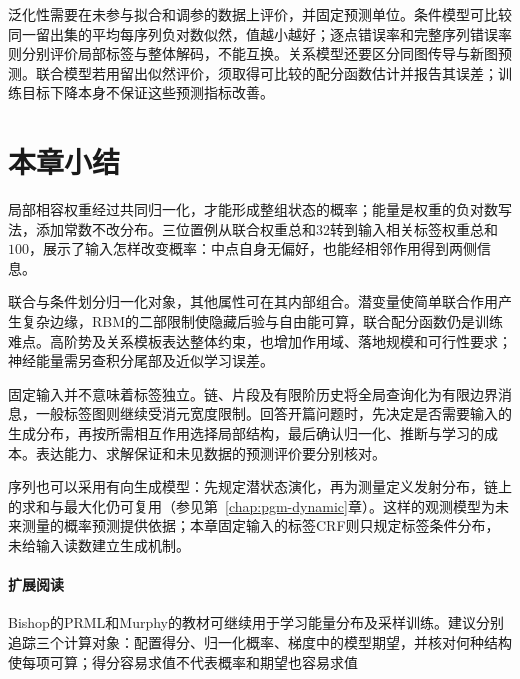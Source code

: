 泛化性需要在未参与拟合和调参的数据上评价，并固定预测单位。条件模型可比较同一留出集的平均每序列负对数似然，值越小越好；逐点错误率和完整序列错误率则分别评价局部标签与整体解码，不能互换。关系模型还要区分同图传导与新图预测。联合模型若用留出似然评价，须取得可比较的配分函数估计并报告其误差；训练目标下降本身不保证这些预测指标改善。

\section{本章小结}
\label{sec:pgm-energy-models-summary}

局部相容权重经过共同归一化，才能形成整组状态的概率；能量是权重的负对数写法，添加常数不改分布。三位置例从联合权重总和$32$转到输入相关标签权重总和$100$，展示了输入怎样改变概率：中点自身无偏好，也能经相邻作用得到两侧信息。

联合与条件划分归一化对象，其他属性可在其内部组合。潜变量使简单联合作用产生复杂边缘，RBM的二部限制使隐藏后验与自由能可算，联合配分函数仍是训练难点。高阶势及关系模板表达整体约束，也增加作用域、落地规模和可行性要求；神经能量需另查积分尾部及近似学习误差。

固定输入并不意味着标签独立。链、片段及有限阶历史将全局查询化为有限边界消息，一般标签图则继续受消元宽度限制。回答开篇问题时，先决定是否需要输入的生成分布，再按所需相互作用选择局部结构，最后确认归一化、推断与学习的成本。表达能力、求解保证和未见数据的预测评价要分别核对。

序列也可以采用有向生成模型：先规定潜状态演化，再为测量定义发射分布，链上的求和与最大化仍可复用（参见第~\ref{chap:pgm-dynamic}章）。这样的观测模型为未来测量的概率预测提供依据；本章固定输入的标签CRF则只规定标签条件分布，未给输入读数建立生成机制。

\paragraph{扩展阅读}
Bishop的PRML和Murphy的教材可继续用于学习能量分布及采样训练。建议分别追踪三个计算对象：配置得分、归一化概率、梯度中的模型期望，并核对何种结构使每项可算；得分容易求值不代表概率和期望也容易求值

